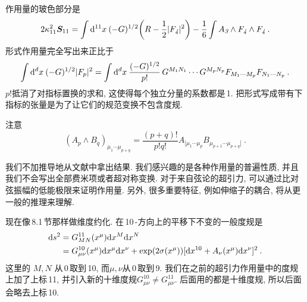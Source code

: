 作用量的玻色部分是
\begin{equation}
    2\kappa_{11}^{2}\bm{S}_{11}=\int\mathrm{d}^{11}x\:(-G)^{1/2}\biggl(R-\frac{1}{2}\lvert F_{\textit{4}}\rvert^{2}\biggr)-\frac{1}{6}\int A_{\textit{3}}\wedge F_{\textit{4}}\wedge F_{\textit{4}} \:. \label{12.1.1}
\end{equation}
形式作用量完全写出来正比于
\begin{equation}
    \int\mathrm{d}^{d}x\:(-G)^{1/2}\lvert F_{p}\rvert^{2} = \int \mathrm{d}^{d}x\:\frac{(-G)^{1/2}}{p!}\,G^{M_{1}N_{1}}\cdots G^{M_{p}N_{p}}F_{M_{1}\cdots M_{p}}F_{N_{1}\cdots N_{p}} \:. \label{12.1.2}
\end{equation}
$p! $抵消了对指标置换的求和, 这使得每个独立分量的系数都是\,1.  把形式写成带有下指标的张量是为了让它们的规范变换不包含度规.
\begin{tcolorbox}
    注意
    \[(A_{p}\wedge B_{q})_{\mu_{1}\cdots\mu_{p+q}} = \frac{(p+q)!}{p!q!}A_{[\mu_{1}\cdots \mu_{p}}B_{\mu_{p+1}\cdots\mu_{p+q}]} \:.\]
\end{tcolorbox}

我们不加推导地从文献中拿出结果. 我们感兴趣的是各种作用量的普遍性质, 并且我们不会写出全部费米项或者超对称变换. 对于来自弦论的超引力, 可以通过比对弦振幅的低能极限来证明作用量. 另外, 很多重要特征, 例如伸缩子的耦合, 将从更一般的推理来理解.

现在像\,8.1\,节那样做维度约化. 在\,10\,-方向上的平移下不变的一般度规是
\begin{align}
    \mathrm{d} s^{2} &= G_{MN}^{11}(x^{\mu})\mathrm{d} x^{M}\mathrm{d} x^{N} \nonumber \\
    &= G_{\mu\nu}^{10}(x^{\mu})\mathrm{d} x^{\mu}\mathrm{d} x^{\nu} + \exp(2\sigma(x^{\mu}))[\mathrm{d} x^{10}+A_{\nu}(x^{\mu})\mathrm{d} x^{\nu}]^{2} \:. \label{12.1.3}
\end{align}
这里的 $M,N$ 从\,0\,取到\,10, 而$ \mu,\nu $从\,0\,取到\,9. 我们在之前的超引力作用量中的度规上加了上标\,11, 并引入新的十维度规$ G_{\mu\nu}^{10}\neq G_{\mu\nu}^{11}$. 后面用的都是十维度规, 所以后面会略去上标\,10.

